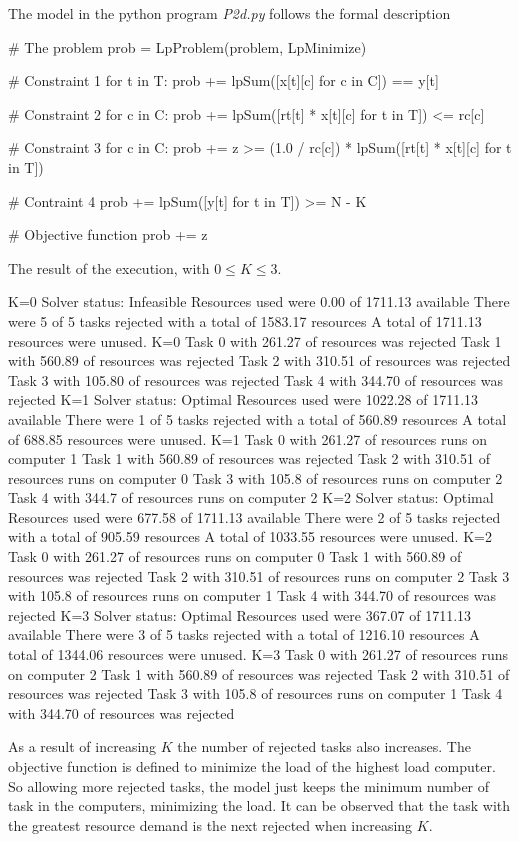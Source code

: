 \documentclass[11pt,a4paper]{article}
\begin{document}
The model in the python program {\sl P2d.py} follows the formal description
\begin{pycode}
# The problem
prob = LpProblem(problem, LpMinimize)

# Constraint 1
for t in T:
	prob += lpSum([x[t][c] for c in C]) == y[t]

# Constraint 2
for c in C:
	prob += lpSum([rt[t] * x[t][c] for t in T]) <= rc[c]

# Constraint 3
for c in C:
	prob += z >= (1.0 / rc[c]) * lpSum([rt[t] * x[t][c] for t in T])

# Contraint 4
prob += lpSum([y[t] for t in T]) >= N - K


# Objective function
prob += z
\end{pycode}
%
The result of the execution, with $0 \le K \le 3$.
\begin{textcode}
K=0
Solver status: Infeasible
Resources used were 0.00 of 1711.13 available
There were 5 of 5 tasks rejected with a total of 1583.17 resources
A total of 1711.13 resources were unused. K=0
Task 0 with 261.27 of resources was rejected
Task 1 with 560.89 of resources was rejected
Task 2 with 310.51 of resources was rejected
Task 3 with 105.80 of resources was rejected
Task 4 with 344.70 of resources was rejected
K=1
Solver status: Optimal
Resources used were 1022.28 of 1711.13 available
There were 1 of 5 tasks rejected with a total of 560.89 resources
A total of 688.85 resources were unused. K=1
Task 0 with 261.27 of resources runs on computer 1
Task 1 with 560.89 of resources was rejected
Task 2 with 310.51 of resources runs on computer 0
Task 3 with 105.8 of resources runs on computer 2
Task 4 with 344.7 of resources runs on computer 2
K=2
Solver status: Optimal
Resources used were 677.58 of 1711.13 available
There were 2 of 5 tasks rejected with a total of 905.59 resources
A total of 1033.55 resources were unused. K=2
Task 0 with 261.27 of resources runs on computer 0
Task 1 with 560.89 of resources was rejected
Task 2 with 310.51 of resources runs on computer 2
Task 3 with 105.8 of resources runs on computer 1
Task 4 with 344.70 of resources was rejected
K=3
Solver status: Optimal
Resources used were 367.07 of 1711.13 available
There were 3 of 5 tasks rejected with a total of 1216.10 resources
A total of 1344.06 resources were unused. K=3
Task 0 with 261.27 of resources runs on computer 2
Task 1 with 560.89 of resources was rejected
Task 2 with 310.51 of resources was rejected
Task 3 with 105.8 of resources runs on computer 1
Task 4 with 344.70 of resources was rejected
\end{textcode}
%
As a result of increasing $K$ the number of rejected tasks also increases. The 
objective function is defined to minimize the load of the highest load computer.  
So allowing more rejected tasks, the model just keeps the minimum number of task 
in the computers, minimizing the load. It can be observed that the task with the 
greatest resource demand is the next rejected when increasing $K$.
\end{document}

